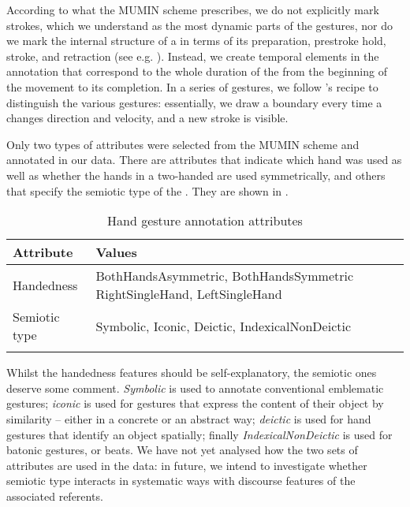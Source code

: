 \documentclass[output=paper]{LSP/langsci}
\begin{document}
\largerpage
According to what the MUMIN scheme prescribes, we do not explicitly
mark  strokes, which we understand as the most dynamic parts of
the gestures, nor do we mark the internal structure of a  in
terms of its preparation, prestroke hold, stroke, and retraction (see
e.g. \citealt{McNeill92}). Instead, we create temporal elements in the
annotation that correspond to the whole duration of the  from
the beginning of the movement to its completion. In a series of
gestures, we follow \cite{Kipp2004}'s recipe to distinguish the various
gestures: essentially, we draw a boundary every time a  changes
direction and velocity, and a new stroke is visible.

Only two types of attributes were selected from the MUMIN scheme and
annotated in our data. There are attributes that indicate which hand
was used as well as whether the hands in a two-handed  are used
symmetrically, and others that specify the semiotic type of the
. They are shown in .

\begin{table}
  \begin{tabularx}{\textwidth}{lQ}
    \lsptoprule
 Attribute     & Values \\
    \midrule
    {Handedness} &  {BothHandsAsymmetric, BothHandsSymmetric}  {RightSingleHand, LeftSingleHand} \\
    \midrule
{Semiotic type} & {Symbolic, Iconic, Deictic, IndexicalNonDeictic}\\
\lspbottomrule
  \end{tabularx}
  \caption{Hand gesture annotation attributes}
  \label{tab:paggio:attributes}
\end{table}


Whilst the handedness features should be self-explanatory, the semiotic ones
deserve some comment. {\em Symbolic} is used to annotate conventional
emblematic gestures; {\em iconic} is used for gestures that express
the content of their object by similarity -- either in a concrete or
an abstract way; {\em deictic} is used for hand gestures that identify
an object spatially; finally {\em IndexicalNonDeictic} is used for
batonic gestures, or beats.  We have not yet analysed how the two sets
of attributes are used in the data: in future, we intend to
investigate whether semiotic type interacts in systematic ways
with discourse features of the associated referents.
\end{document}
